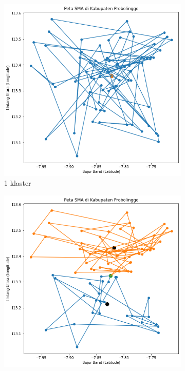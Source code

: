 \begin{figure}[H]
	\centering
	\begin{subfigure}[b]{0.3\textwidth}
		\includegraphics[width=\textwidth]{Gambar/hasil_mtsp/1.png}
		\caption{1 klaster}	
		\label{fig:klasterbeda1}
	\end{subfigure}
	\hfill
	\begin{subfigure}[b]{0.3\textwidth}
		\includegraphics[width=\textwidth]{Gambar/hasil_mtsp/2.png}

\end{subfigure}
\end{figure}
